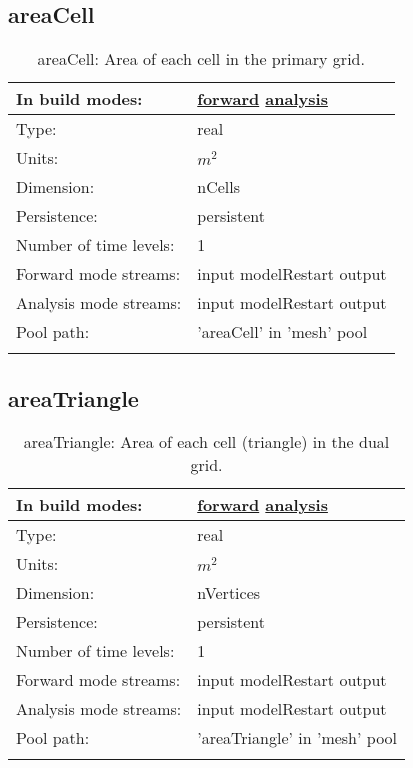 \subsection[areaCell]{areaCell}
\label{subsec:var_sec_mesh_areaCell}
\begin{center}
\begin{longtable}{| p{2.0in} | p{4.0in} |}
        \hline 
        In build modes: & \hyperref[subsec:forward_var_tab_mesh]{forward} \hyperref[subsec:analysis_var_tab_mesh]{analysis} \\
        \hline 
        Type: & real \\
        \hline 
        Units: & $m^2$ \\
        \hline 
        Dimension: & nCells \\
        \hline 
        Persistence: & persistent \\
        \hline 
        Number of time levels: & 1 \\
        \hline 
		 Forward mode streams: &  input modelRestart output \\
        \hline 
		 Analysis mode streams: &  input modelRestart output \\
        \hline 
            Pool path: & 'areaCell' in 'mesh' pool
 \\
		 \hline 
    \caption{areaCell: Area of each cell in the primary grid.}
\end{longtable}
\end{center}
\subsection[areaTriangle]{areaTriangle}
\label{subsec:var_sec_mesh_areaTriangle}
\begin{center}
\begin{longtable}{| p{2.0in} | p{4.0in} |}
        \hline 
        In build modes: & \hyperref[subsec:forward_var_tab_mesh]{forward} \hyperref[subsec:analysis_var_tab_mesh]{analysis} \\
        \hline 
        Type: & real \\
        \hline 
        Units: & $m^2$ \\
        \hline 
        Dimension: & nVertices \\
        \hline 
        Persistence: & persistent \\
        \hline 
        Number of time levels: & 1 \\
        \hline 
		 Forward mode streams: &  input modelRestart output \\
        \hline 
		 Analysis mode streams: &  input modelRestart output \\
        \hline 
            Pool path: & 'areaTriangle' in 'mesh' pool
 \\
		 \hline 
    \caption{areaTriangle: Area of each cell (triangle) in the dual grid.}
\end{longtable}
\end{center}
